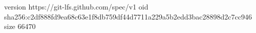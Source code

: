 version https://git-lfs.github.com/spec/v1
oid sha256:c2df888fd9ea68c63e1f8db759df44d7711a229a5b2edd3bac28898d2c7cc946
size 66470
